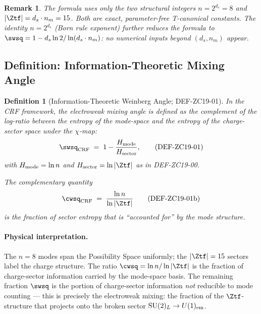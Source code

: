 \documentclass[12pt, a4paper]{article}
\newtheorem{definition}{Definition}[section]
\newtheorem{remark}{Remark}[section]
\begin{document}
\begin{remark}
The formula uses only the two structural integers $n = 2^{d_s} = 8$
and $|\Ztf| = d_s\cdot n_m = 15$.
Both are exact, parameter-free T-canonical constants.
The identity $n = 2^{d_s}$ (Born rule exponent) further reduces the
formula to $\swsq = 1 - d_s\ln 2/\ln(d_s\cdot n_m)$: no numerical
inputs beyond $(d_s, n_m)$ appear.
\end{remark}

\subsection{Definition: Information-Theoretic Mixing Angle}
\label{zc19:sec:def}

\begin{definition}[Information-Theoretic Weinberg Angle; DEF-ZC19-01]
\label{zc19:def:weinberg-info}
In the CRF framework, the electroweak mixing angle is defined as the
\emph{complement of the log-ratio} between the entropy of the
mode-space and the entropy of the charge-sector space under the
$\chi$-map:
\begin{equation}
  \swsq_{\rm CRF} \;=\; 1 - \frac{H_{\rm mode}}{H_{\rm sector}},
  \tag{DEF-ZC19-01}
\end{equation}
with $H_{\rm mode} = \ln n$ and $H_{\rm sector} = \ln|\Ztf|$
as in DEF-ZC19-00.

The complementary quantity
\begin{equation}
  \cwsq_{\rm CRF} \;=\; \frac{\ln n}{\ln|\Ztf|}
  \tag{DEF-ZC19-01b}
\end{equation}
is the fraction of sector entropy that is ``accounted for'' by
the mode structure.
\end{definition}

\paragraph{Physical interpretation.}
The $n = 8$ modes span the Possibility Space uniformly;
the $|\Ztf| = 15$ sectors label the charge structure.
The ratio $\cwsq = \ln n/\ln|\Ztf|$ is the fraction of charge-sector
information carried by the mode-space basis.
The remaining fraction $\swsq$ is the portion of charge-sector
information \emph{not} reducible to mode counting --- this is
precisely the electroweak mixing: the fraction of the
$\Ztf$-structure that projects onto the broken sector
$\mathrm{SU}(2)_L\to U(1)_{\rm em}$.
\end{document}
